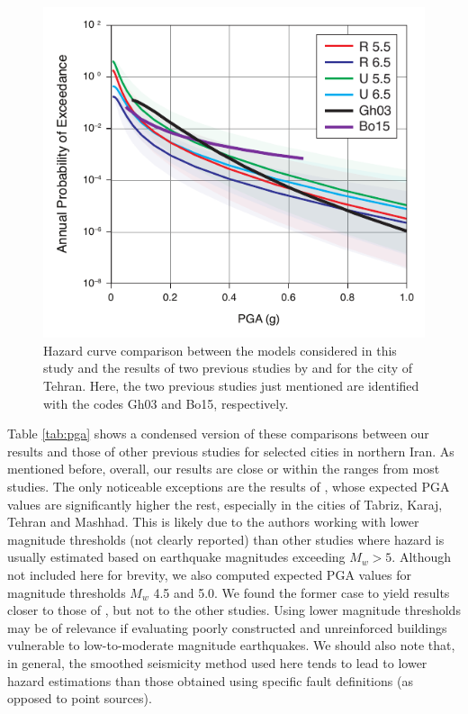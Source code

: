 \begin{figure}[t]
    \centering
    \includegraphics[width=\columnwidth]{figures/pdf/figure-13} 
    \caption{Hazard curve comparison between the models considered in this study and the results of two previous studies by \citet{Ghodrati2003} and \citet{Boostan2015} for the city of Tehran. Here, the two previous studies just mentioned are identified with the codes Gh03 and Bo15, respectively.}
    \label{fig:tehran}
\end{figure}

Table \ref{tab:pga} shows a condensed version of these comparisons between our results and those of other previous studies for selected cities in northern Iran. As mentioned before, overall, our results are close or within the ranges from most studies. The only noticeable exceptions are the results of \citet{Golara2014}, whose expected PGA values are significantly higher the rest, especially in the cities of Tabriz, Karaj, Tehran and Mashhad. This is likely due to the authors working with lower magnitude thresholds (not clearly reported) than other studies where hazard is usually estimated based on earthquake magnitudes exceeding $M_w > 5$. Although not included here for brevity, we also computed expected PGA values for magnitude thresholds $M_w$ 4.5 and 5.0. We found the former case to yield results closer to those of \citet{Golara2014}, but not to the other studies. Using lower magnitude thresholds may be of relevance if evaluating poorly constructed and unreinforced buildings vulnerable to low-to-moderate magnitude earthquakes. We should also note that, in general, the smoothed seismicity method used here tends to lead to lower hazard estimations than those obtained using specific fault definitions (as opposed to point sour\-ces).

